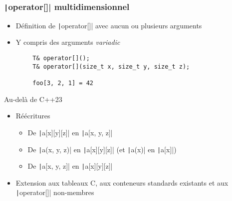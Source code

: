\documentclass[C++.tex]{subfiles}
\begin{document}
\begin{frame}[fragile]
	\frametitle{\texttt|operator[]| multidimensionnel}
	\begin{itemize}
		\item Définition de \texttt|operator[]| avec aucun ou plusieurs arguments
		\item Y compris des arguments \textit{variadic}
	\end{itemize}

	\begin{verbatim}
		T& operator[]();
		T& operator[](size_t x, size_t y, size_t z);

		foo[3, 2, 1] = 42
	\end{verbatim}


	\begin{block}{Au-delà de C++23}
		\begin{itemize}
			\item Réécritures
			\begin{itemize}
				\item De \texttt|a[x][y][z]| en \texttt|a[x, y, z]|
				\item De \texttt|a(x, y, z)| en \texttt|a[x][y][z]| (et  \texttt|a(x)| en \texttt|a[x]|)
				\item De \texttt|a[x, y, z]| en \texttt|a[x][y][z]|
			\end{itemize}
			\item Extension aux tableaux C, aux conteneurs standards existants et aux \texttt|operator[]| non-membres
		\end{itemize}
	\end{block}


\end{frame}
\end{document}
